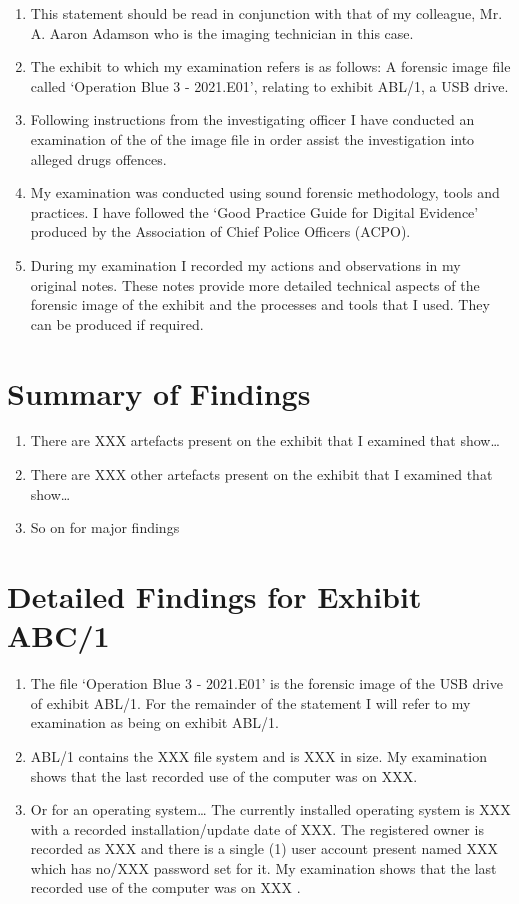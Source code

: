 \documentclass[11pt]{article}
\begin{document}
\begin{enumerate}[resume]
    \item This statement should be read in conjunction with that of my colleague, Mr. A. Aaron Adamson who is the imaging technician in this case.
    \item The exhibit to which my examination refers is as follows: A forensic image file called ‘Operation Blue 3 - 2021.E01’, relating to exhibit ABL/1, a USB drive.
    \item Following instructions from the investigating officer I have conducted an examination of the of the image file in order assist the investigation into alleged drugs offences.
    \item My examination was conducted using sound forensic methodology, tools and practices. I have followed the ‘Good Practice Guide for Digital Evidence’ produced by the Association of Chief Police Officers (ACPO).
    \item During my examination I recorded my actions and observations in my original notes. These notes provide more detailed technical aspects of the forensic image of the exhibit and the processes and tools that I used. They can be produced if required.
\end{enumerate}

\section*{Summary of Findings}
\begin{enumerate}[resume]
    \item There are XXX artefacts present on the exhibit that I examined that show…
    \item There are XXX other artefacts present on the exhibit that I examined that show…
    \item So on for major findings
\end{enumerate}

\section*{Detailed Findings for Exhibit ABC/1}
\begin{enumerate}[resume]
    \item The file ‘Operation Blue 3 - 2021.E01’ is the forensic image of the USB drive of exhibit ABL/1. For the remainder of the statement I will refer to my examination as being on exhibit ABL/1.
    \item ABL/1 contains the XXX file system and is XXX in size. My examination shows that the last recorded use of the computer was on XXX.
    \item Or for an operating system… The currently installed operating system is XXX with a recorded installation/update date of XXX. The registered owner is recorded as XXX and there is a single (1) user account present named XXX which has no/XXX password set for it.  My examination shows that the last recorded use of the computer was on XXX .
\end{enumerate}
\end{document}
